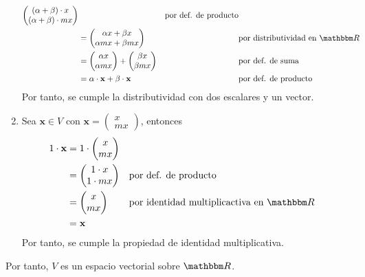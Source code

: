 \begin{examplebox}{}{}
\begin{enumerate}[label=\roman*), topsep=6pt, itemsep=0pt]
\begin{align*}
\begin{pmatrix}
                (\alpha + \beta) \cdot x \\
                (\alpha + \beta) \cdot mx
            \end{pmatrix} && \text{por def. de producto} \\
            & = \begin{pmatrix}
                \alpha x + \beta x \\
                \alpha mx + \beta mx
            \end{pmatrix} && \text{por distributividad en $\RR$} \\
            & = \begin{pmatrix}
                \alpha x \\
                \alpha mx
            \end{pmatrix} + \begin{pmatrix}
                \beta x \\
                \beta mx
            \end{pmatrix} && \text{por def. de suma} \\
            & = \alpha \cdot \mathbf{x} + \beta \cdot \mathbf{x} && \text{por def. de producto}
        \end{align*}
        Por tanto, se cumple la distributividad con dos escalares y un vector.
        \item Sea $\mathbf{x} \in V$ con $\mathbf{x} = \begin{pmatrix}
            x \\
            mx
        \end{pmatrix}$, entonces
        \begin{align*}
            1 \cdot \mathbf{x} & = 1 \cdot \begin{pmatrix}
                x \\
                mx
            \end{pmatrix} \\
            & = \begin{pmatrix}
                1 \cdot x \\
                1 \cdot mx
            \end{pmatrix} && \text{por def. de producto} \\
            & = \begin{pmatrix}
                x \\
                mx
            \end{pmatrix} && \text{por identidad multiplicactiva en $\RR$} \\
            & = \mathbf{x}
        \end{align*}
        Por tanto, se cumple la propiedad de identidad multiplicativa.
    \end{enumerate}
    Por tanto, $V$ es un espacio vectorial sobre $\RR$.
\end{examplebox}
